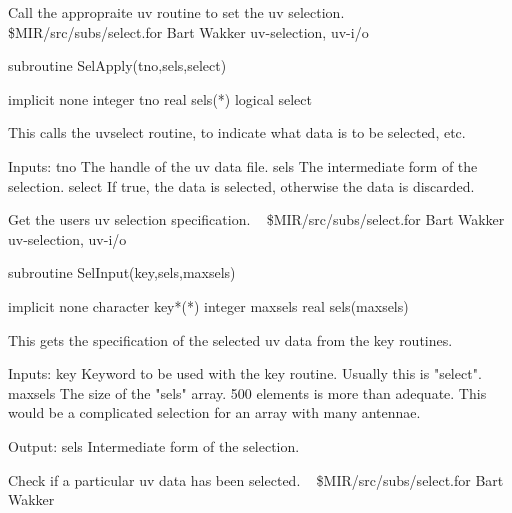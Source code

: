 %
\noindent Call the appropraite uv routine to set the uv selection.
\newline \ 
\newline {} \$MIR/src/subs/select.for
\newline {} Bart Wakker
\newline {} uv-selection, uv-i/o
\par{\tenpoint
{\eightpoint\begintt
        subroutine SelApply(tno,sels,select)

        implicit none
        integer tno
        real sels(*)
        logical select

  This calls the uvselect routine, to indicate what data is to be
  selected, etc.

  Inputs:
    tno        The handle of the uv data file.
    sels       The intermediate form of the selection.
    select     If true, the data is selected, otherwise the data is
               discarded.
\endtt}
\par}
%
\noindent Get the users uv selection specification.
\newline \ 
\newline {} \$MIR/src/subs/select.for
\newline {} Bart Wakker
\newline \abox{Keywords:} uv-selection, uv-i/o
\par{\tenpoint
{\eightpoint\begintt
        subroutine SelInput(key,sels,maxsels)

        implicit none
        character key*(*)
        integer maxsels
        real sels(maxsels)

  This gets the specification of the selected uv data from the key
  routines.

  Inputs:
    key        Keyword to be used with the key routine. Usually this is
               "select".
    maxsels    The size of the "sels" array. 500 elements is
               more than adequate. This would be a complicated selection
               for an array with many antennae.

  Output:
    sels       Intermediate form of the selection.
\endtt}
\par}
%
\noindent Check if a particular uv data has been selected.
\newline \ 
\newline {} \$MIR/src/subs/select.for
\newline \abox{Responsible:} Bart Wakker
